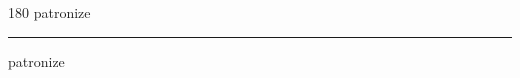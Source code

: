 
\begin{frame}
\begin{center}
\begin{turn}{180}
{\fontsize{2.5cm}{1em}\selectfont patronize}
\end{turn}
\vspace{1em}\par  
\hrule
\vspace{1em}\par  
{\fontsize{2.5cm}{1em}\selectfont patronize}
\end{center}
\end{frame}
